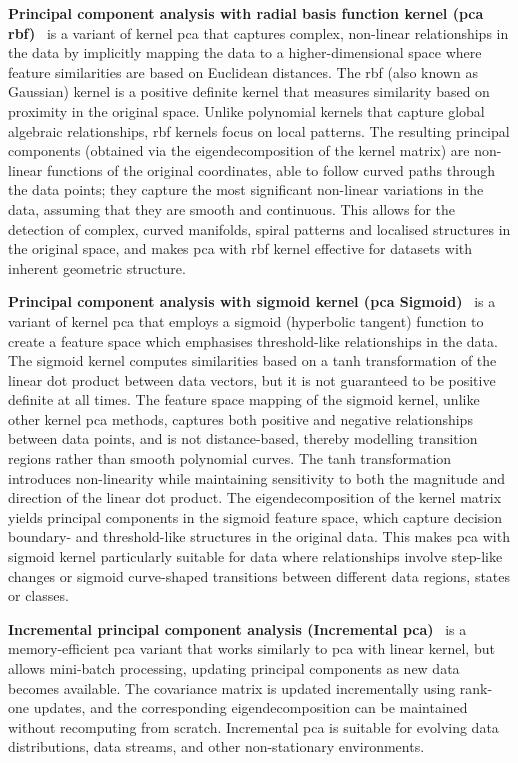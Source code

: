     \noindent \textbf{Principal component analysis with radial basis function kernel (\gls{pca} \gls{rbf})}~\citep{SchEtAl97} is a variant of kernel \gls{pca} that captures complex, non-linear relationships in the data by implicitly mapping the data to a higher-dimensional space where feature similarities are based on Euclidean distances. The \gls{rbf} (also known as Gaussian) kernel is a positive definite kernel that measures similarity based on proximity in the original space. Unlike polynomial kernels that capture global algebraic relationships, \gls{rbf} kernels focus on local patterns. The resulting principal components (obtained via the eigendecomposition of the kernel matrix) are non-linear functions of the original coordinates, able to follow curved paths through the data points; they capture the most significant non-linear variations in the data, assuming that they are smooth and continuous. This allows for the detection of complex, curved manifolds, spiral patterns and localised structures in the original space, and makes \gls{pca} with \gls{rbf} kernel effective for datasets with inherent geometric structure.

    \noindent \textbf{Principal component analysis with sigmoid kernel (\gls{pca} Sigmoid)}~\citep{SchEtAl97} is a variant of kernel \gls{pca} that employs a sigmoid (hyperbolic tangent) function to create a feature space which emphasises threshold-like relationships in the data. The sigmoid kernel computes similarities based on a tanh transformation of the linear dot product between data vectors, but it is not guaranteed to be positive definite at all times. The feature space mapping of the sigmoid kernel, unlike other kernel \gls{pca} methods, captures both positive and negative relationships between data points, and is not distance-based, thereby modelling transition regions rather than smooth polynomial curves.
    The tanh transformation introduces non-linearity while maintaining sensitivity to both the magnitude and direction of the linear dot product. The eigendecomposition of the kernel matrix yields principal components in the sigmoid feature space, which capture decision boundary- and threshold-like structures in the original data. This makes \gls{pca} with sigmoid kernel particularly suitable for data where relationships involve step-like changes or sigmoid curve-shaped transitions between different data regions, states or classes.

    \noindent \textbf{Incremental principal component analysis (Incremental \gls{pca})}~\citep{RosEtAl08} is a memory-efficient \gls{pca} variant that works similarly to \gls{pca} with linear kernel, but allows mini-batch processing, updating principal components as new data becomes available. The covariance matrix is updated incrementally using rank-one updates, and the corresponding eigendecomposition can be maintained without recomputing from scratch. Incremental \gls{pca} is suitable for evolving data distributions, data streams, and other non-stationary environments.

